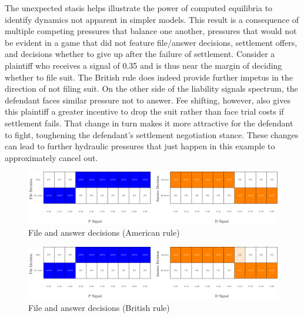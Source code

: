 \documentclass{article}
\begin{document}
The unexpected stasis helps illustrate the power of computed equilibria to identify dynamics not apparent in simpler models. This result is a consequence of multiple competing pressures that balance one another, pressures that would not be evident in a game that did not feature file/answer decisions, settlement offers, and decisions whether to give up after the failure of settlement. Consider a plaintiff who receives a signal of 0.35 and is thus near the margin of deciding whether to file suit. The British rule does indeed provide further impetus in the direction of not filing suit. On the other side of the liability signals spectrum, the defendant faces similar pressure not to answer. Fee shifting, however, also gives this plaintiff a greater incentive to drop the suit rather than face trial costs if settlement fails. That change in turn makes it more attractive for the defendant to fight, toughening the defendant's settlement negotiation stance. These changes can lead to further hydraulic pressures that just happen in this example to approximately cancel out. 

\begin{figure}[h!]
\centering
\includegraphics[scale=0.50, trim={0in 0in 0in 0in}, clip]{../Figures/File and answer decisions (American).pdf}
\caption{File and answer decisions (American rule)}
\label{fig:fileans_american}
\end{figure}

\begin{figure}[h!]
\centering
\includegraphics[scale=0.50, trim={0in 0in 0in 0in}, clip]{../Figures/File and answer decisions (British).pdf}
\caption{File and answer decisions (British rule)}
\label{fig:fileans_british}
\end{figure}
\end{document}
